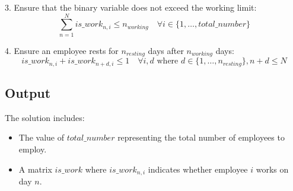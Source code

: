 \documentclass{article}
\begin{document}
3. Ensure that the binary variable does not exceed the working limit:
\[
\sum_{n=1}^{N} is\_work_{n, i} \leq n_{working} \quad \forall i \in \{1, \ldots, total\_number\}
\]

4. Ensure an employee rests for $n_{resting}$ days after $n_{working}$ days:
\[
is\_work_{n, i} + is\_work_{n + d, i} \leq 1 \quad \forall i, d \text{ where } d \in \{1, \ldots, n_{resting}\}, n + d \leq N
\]

\subsection*{Output}
The solution includes:
\begin{itemize}
    \item The value of $total\_number$ representing the total number of employees to employ.
    \item A matrix $is\_work$ where $is\_work_{n, i}$ indicates whether employee $i$ works on day $n$.
\end{itemize}
\end{document}
